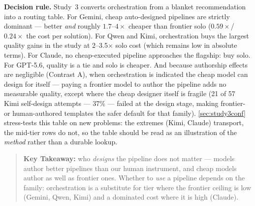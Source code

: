 \documentclass[12pt,a4paper]{article}
\begin{document}

\textbf{Decision rule.} Study~3 converts orchestration from a blanket
recommendation into a routing table. For Gemini, cheap auto-designed pipelines
are strictly dominant --- better \emph{and} roughly $1.7$--$4\times$ cheaper
than frontier solo ($0.59\times$/$0.24\times$ the cost per solution). For Qwen and Kimi, orchestration buys the largest quality gains in the
study at 2--3.5$\times$ solo cost (which remains low in absolute terms).
For Claude, no cheap-executed pipeline approaches the flagship: buy solo.
For GPT-5.6, quality is a tie and solo is cheaper. And because authorship
effects are negligible (Contrast A), when orchestration is indicated the cheap
model can design for itself --- paying a frontier model to author the pipeline
adds no measurable quality, except
where the cheap designer itself is fragile (21 of 57 Kimi self-design attempts
--- 37\% --- failed at the design stage, making frontier- or human-authored
templates the safer default for that family). \cref{sec:study3conf} stress-tests this table on new problems:
the extremes (Kimi, Claude) transport, the mid-tier rows do not, so the table
should be read as an illustration of the \emph{method} rather than a durable
lookup.

\begin{quote}
\textbf{Key Takeaway:} who \emph{designs} the pipeline does not matter ---
models author better pipelines than our human instrument, and cheap models
author as well as frontier ones. Whether to \emph{use} a pipeline depends on
the family: orchestration is a substitute for tier where the frontier ceiling
is low (Gemini, Qwen, Kimi) and a dominated cost where it is high (Claude).
\end{quote}
\end{document}
